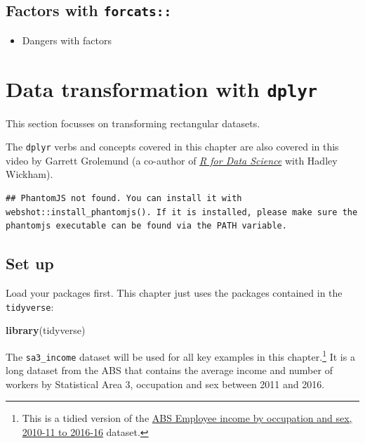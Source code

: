 \documentclass[
]{book}
\newenvironment{Shaded}{\begin{snugshade}}{\end{snugshade}}
\newcommand{\KeywordTok}[1]{\textcolor[rgb]{0.13,0.29,0.53}{\textbf{#1}}}
\newcommand{\NormalTok}[1]{#1}
\providecommand{\tightlist}{%
  \setlength{\itemsep}{0pt}\setlength{\parskip}{0pt}}
\begin{document}
\hypertarget{factors-with-forcats}{%
\section{\texorpdfstring{Factors with \texttt{forcats::}}{Factors with forcats::}}\label{factors-with-forcats}}

\begin{itemize}
\tightlist
\item
  Dangers with factors
\end{itemize}

\hypertarget{data-transformation-with-dplyr}{%
\chapter{\texorpdfstring{Data transformation with \texttt{dplyr}}{Data transformation with dplyr}}\label{data-transformation-with-dplyr}}

This section focusses on transforming rectangular datasets.

The \texttt{dplyr} verbs and concepts covered in this chapter are also covered in this video by Garrett Grolemund (a co-author of \emph{\href{https://r4ds.had.co.nz/}{R for Data Science}} with Hadley Wickham).

\begin{verbatim}
## PhantomJS not found. You can install it with webshot::install_phantomjs(). If it is installed, please make sure the phantomjs executable can be found via the PATH variable.
\end{verbatim}

\hypertarget{set-up}{%
\section{Set up}\label{set-up}}

Load your packages first. This chapter just uses the packages contained in the \texttt{tidyverse}:

\begin{Shaded}
\begin{Highlighting}[]
\KeywordTok{library}\NormalTok{(tidyverse)}
\end{Highlighting}
\end{Shaded}

The \texttt{sa3\_income} dataset will be used for all key examples in this chapter.\footnote{This is a tidied version of the \href{https://www.abs.gov.au/AUSSTATS/abs@.nsf/DetailsPage/6524.0.55.0022011-2016?OpenDocument}{ABS Employee income by occupation and sex, 2010-11 to 2016-16} dataset.} It is a long dataset from the ABS that contains the average income and number of workers by Statistical Area 3, occupation and sex between 2011 and 2016.
\end{document}
